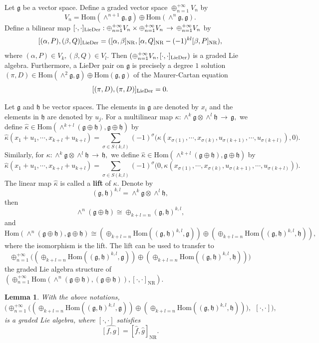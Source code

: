 \documentclass[12pt]{amsart}
\newtheorem{lem}[thm]{Lemma}
\newcommand{\lon }{\,\rightarrow\,}
\newcommand{\g}{\mathfrak g}
\newcommand{\h}{\mathfrak h}
\newcommand{\Hom}{\mathrm{Hom}}
\newcommand{\LD}{{\rm LieDer }}
\newcommand{\NR}{\mathrm{NR}}
\begin{document}
Let $\g$ be a vector space. Define a graded vector space $\oplus_{n=1}^{+\infty}V_n$ by
$$
V_n=\Hom(\wedge^{n+1}\g, \g)\oplus\Hom(\wedge^n\g, \g).
$$
Define a bilinear map $[\cdot, \cdot]_{\LD}:\oplus_{n=1}^{+\infty}V_n\times\oplus_{n=1}^{+\infty}V_n\lon\oplus_{n=1}^{+\infty}V_{n}$ by
$$
[(\alpha, P), (\beta, Q)]_\LD=([\alpha, \beta]_\NR, [\alpha, Q]_\NR-(-1)^{kl}[\beta, P]_{\NR}),
$$
where $(\alpha, P)\in V_{k}, (\beta, Q)\in V_{l}$. Then $(\oplus_{n=1}^{+\infty}V_n, [\cdot, \cdot]_\LD)$ is a graded Lie algebra\cite{JS,LQYZ,TFS}. Furthermore, a \LD pair on $\g$ is precisely a degree $1$ solution $(\pi, D)\in\Hom(\wedge^2\g, \g)\oplus\Hom(\g, \g)$ of the {\rm Maurer-Cartan} equation
$$
[(\pi, D), (\pi, D)]_\LD=0.
$$

Let $\g$ and $\h$ be vector spaces. The elements in $\g$ are denoted by $x_i$ and the elements in $\h$ are denoted by $u_j$. For a multilinear map $\kappa: \wedge^{k}\g\otimes\wedge^{l}\h\lon \g,$ we define $\hat{\kappa}\in\Hom(\wedge^{k+l}(\g\oplus \h), \g\oplus \h)$ by
\begin{equation*}
\hat{\kappa}(x_1+u_1,\cdots,x_{k+l}+u_{k+l})=\sum_{\sigma\in S(k,l)}(-1)^{\sigma}\Big(\kappa(x_{\sigma(1)},\cdots,x_{\sigma(k)},u_{\sigma(k+1)},\cdots,u_{\sigma(k+l)}),0\Big).
\end{equation*}
Similarly, for $\kappa: \wedge^{k}\g\otimes\wedge^{l}\h\lon \h,$ we define $\hat{\kappa}\in\Hom(\wedge^{k+l}(\g\oplus \h), \g\oplus \h)$ by
\begin{equation*}
\hat{\kappa}(x_1+u_1,\cdots,x_{k+l}+u_{k+l})=\sum_{\sigma\in S(k,l)}(-1)^{\sigma}\Big(0, \kappa(x_{\sigma(1)},\cdots,x_{\sigma(k)},u_{\sigma(k+1)},\cdots,u_{\sigma(k+l)})\Big).
\end{equation*}
The linear map $\hat{\kappa}$ is called a {\bf lift} of $\kappa$.
Denote by $$(\g, \h)^{k,l}=\wedge^{k}\g\otimes\wedge^{l}\h,$$ then $$\wedge^{n}(\g\oplus \h)\cong\oplus_{k+l=n}(\g, \h)^{k,l},$$
and $$\Hom(\wedge^{n}(\g\oplus \h), \g\oplus \h)\cong(\oplus_{k+l=n}\Hom((\g, \h)^{k,l},\g))\oplus(\oplus_{k+l=n}\Hom((\g, \h)^{k,l},\h)),$$ where the isomorphism is the lift. The lift can be used to transfer to $$\oplus^{+\infty}_{n=1}\Big((\oplus_{k+l=n}\Hom((\g, \h)^{k,l},\g))\oplus(\oplus_{k+l=n}\Hom((\g, \h)^{k,l},\h))\Big)$$ the graded Lie algebra structure of $(\oplus_{n=1}^{+\infty}\Hom(\wedge^{n}(\g\oplus\h), (\g\oplus\h)), [\cdot, \cdot]_{\NR})$. 
\begin{lem}\label{lem1111}
With the above notations,
$$\Big(\oplus^{+\infty}_{n=1}\Big((\oplus_{k+l=n}\Hom((\g, \h)^{k,l},\g))\oplus(\oplus_{k+l=n}\Hom((\g, \h)^{k,l},\h))\Big), ~~[\cdot, \cdot]\Big),$$ 
is a graded Lie algebra, where $[\cdot,\cdot]$ satisfies
\begin{equation}\label{defibra}
\widehat{[f, g]}=[\hat{f}, \hat{g}]_{\NR}.
\end{equation}
\end{lem}
\end{document}

